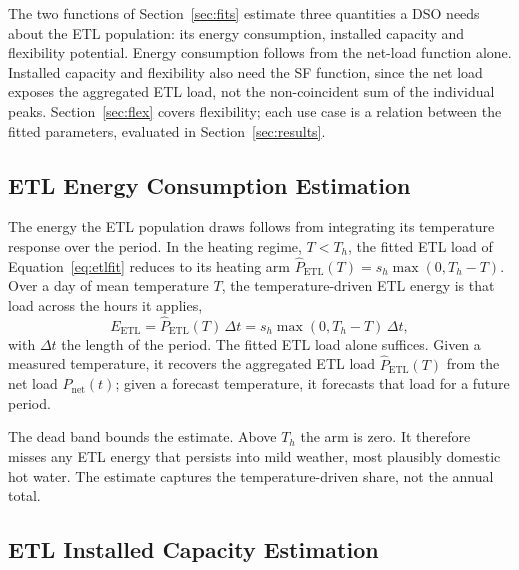 \documentclass[9pt,journal,a4]{IEEEtran}
\begin{document}
The two functions of Section~\ref{sec:fits} estimate three quantities a DSO needs about the ETL population: its energy consumption, installed capacity and flexibility potential. Energy consumption follows from the net-load function alone. Installed capacity and flexibility also need the SF function, since the net load exposes the aggregated ETL load, not the non-coincident sum of the individual peaks. Section~\ref{sec:flex} covers flexibility; each use case is a relation between the fitted parameters, evaluated in Section~\ref{sec:results}.

\subsection{ETL Energy Consumption Estimation}
\label{sec:uc-energy}

The energy the ETL population draws follows from integrating its temperature response over the period. In the heating regime, $T < T_h$, the fitted ETL load of Equation~\eqref{eq:etlfit} reduces to its heating arm $\hat{P}_{\mathrm{ETL}}(T) = s_h \max(0, T_h - T)$. Over a day of mean temperature $T$, the temperature-driven ETL energy is that load across the hours it applies,
\begin{equation}
E_{\mathrm{ETL}} = \hat{P}_{\mathrm{ETL}}(T)\,\Delta t = s_h \max(0, T_h - T)\,\Delta t,
\label{eq:energy}
\end{equation}
with $\Delta t$ the length of the period. The fitted ETL load alone suffices. Given a measured temperature, it recovers the aggregated ETL load $\hat{P}_{\mathrm{ETL}}(T)$ from the net load $P_{\mathrm{net}}(t)$; given a forecast temperature, it forecasts that load for a future period.

The dead band bounds the estimate. Above $T_h$ the arm is zero. It therefore misses any ETL energy that persists into mild weather, most plausibly domestic hot water. The estimate captures the temperature-driven share, not the annual total.

\subsection{ETL Installed Capacity Estimation}
\label{sec:uc-capacity}
\end{document}
